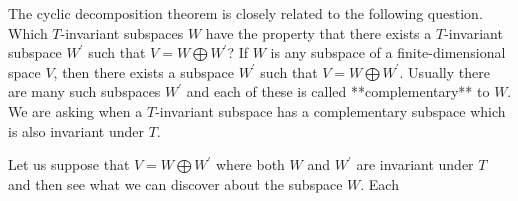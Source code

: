 The cyclic decomposition theorem is closely related to the following question. Which \(T\)-invariant subspaces \(W\) have the property that there exists a \(T\)-invariant subspace \(W^{\prime}\) such that \(V=W\bigoplus W^{\prime}\)? If \(W\) is any subspace of a finite-dimensional space \(V\), then there exists a subspace \(W^{\prime}\) such that \(V=W\bigoplus W^{\prime}\). Usually there are many such subspaces \(W^{\prime}\) and each of these is called **complementary** to \(W\). We are asking when a \(T\)-invariant subspace has a complementary subspace which is also invariant under \(T\).

Let us suppose that \(V=W\bigoplus W^{\prime}\) where both \(W\) and \(W^{\prime}\) are invariant under \(T\) and then see what we can discover about the subspace \(W\). Each 